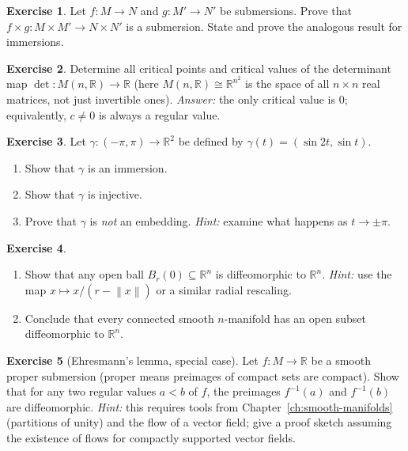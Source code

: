 \documentclass[12pt,a4paper,openany]{book}
\theoremstyle{definition}
\newtheorem{exercise}{Exercise}[chapter]
\theoremstyle{remark}
\newcommand{\R}{\mathbb{R}}
\newcommand{\norm}[1]{\left\lVert #1 \right\rVert}
\begin{document}
\begin{exercise}\label{exo:product-submersion}
Let $f \colon M \to N$ and $g \colon M' \to N'$ be submersions.  Prove that
$f \times g \colon M \times M' \to N \times N'$ is a submersion.  State
and prove the analogous result for immersions.
\end{exercise}

\begin{exercise}\label{exo:det-regular-values}
Determine all critical points and critical values of the determinant map
$\det \colon M(n,\R) \to \R$ (here $M(n,\R) \cong \R^{n^2}$ is the space
of all $n \times n$ real matrices, not just invertible ones).
\textit{Answer:} the only critical value is $0$; equivalently, $c \neq 0$
is always a regular value.
\end{exercise}

\begin{exercise}\label{exo:embedding-figure-eight}
Let $\gamma \colon (-\pi, \pi) \to \R^2$ be defined by
$\gamma(t) = (\sin 2t, \sin t)$.
\begin{enumerate}[label=(\alph*)]
  \item Show that $\gamma$ is an immersion.
  \item Show that $\gamma$ is injective.
  \item Prove that $\gamma$ is \emph{not} an embedding.
  \textit{Hint:} examine what happens as $t \to \pm \pi$.
\end{enumerate}
\end{exercise}

\begin{exercise}\label{exo:diffeomorphism-Rn}
\index{diffeomorphism!of $\R^n$}
\begin{enumerate}[label=(\alph*)]
  \item Show that any open ball $B_r(0) \subseteq \R^n$ is diffeomorphic
    to $\R^n$.
    \textit{Hint:} use the map $x \mapsto x / (r - \norm{x})$ or a similar
    radial rescaling.
  \item Conclude that every connected smooth $n$-manifold has an open
    subset diffeomorphic to $\R^n$.
\end{enumerate}
\end{exercise}

\begin{exercise}[Ehresmann's lemma, special case]\label{exo:ehresmann}
Let $f \colon M \to \R$ be a smooth proper submersion (proper means
preimages of compact sets are compact).  Show that for any two regular
values $a < b$ of $f$, the preimages $f^{-1}(a)$ and $f^{-1}(b)$ are
diffeomorphic.
\textit{Hint:} this requires tools from Chapter~\ref{ch:smooth-manifolds}
(partitions of unity) and the flow of a vector field; give a proof sketch
assuming the existence of flows for compactly supported vector fields.
\end{exercise}
\end{document}
